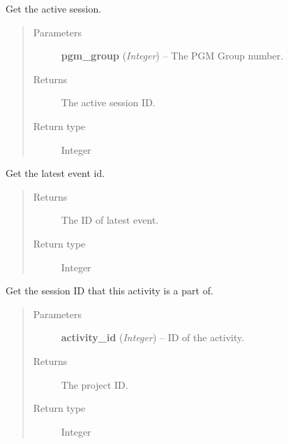 \documentclass[letterpaper,10pt,english]{sphinxmanual}
\begin{document}
\begin{fulllineitems}
\label{controller:controller.session.get_active_session}
Get the active session.
\begin{quote}\begin{description}
\item[{Parameters}] \leavevmode
\textbf{pgm\_group} (\emph{Integer}) -- The PGM Group number.

\item[{Returns}] \leavevmode
The active session ID.

\item[{Return type}] \leavevmode
Integer

\end{description}\end{quote}

\end{fulllineitems}


\begin{fulllineitems}
\label{controller:controller.session.get_latest_event_id}
Get the latest event id.
\begin{quote}\begin{description}
\item[{Returns}] \leavevmode
The ID of latest event.

\item[{Return type}] \leavevmode
Integer

\end{description}\end{quote}

\end{fulllineitems}


\begin{fulllineitems}
\label{controller:controller.session.get_session_id_by_activity}
Get the session ID that this activity is a part of.
\begin{quote}\begin{description}
\item[{Parameters}] \leavevmode
\textbf{activity\_id} (\emph{Integer}) -- ID of the activity.

\item[{Returns}] \leavevmode
The project ID.

\item[{Return type}] \leavevmode
Integer

\end{description}\end{quote}

\end{fulllineitems}
\end{document}
